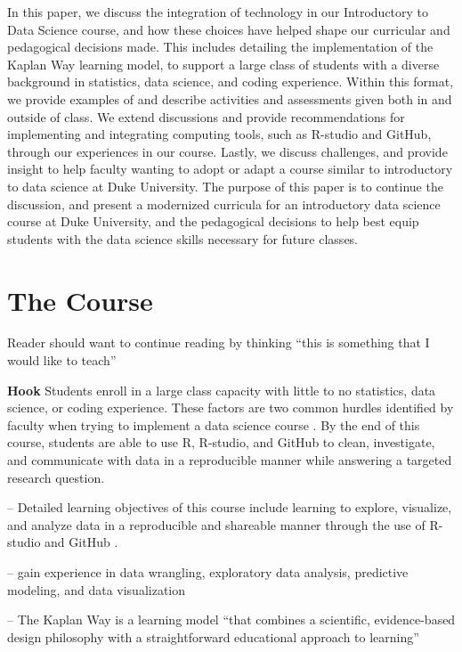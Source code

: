 \documentclass[
  12pt]{article}
\begin{document}
In this paper, we discuss the integration of technology in our
Introductory to Data Science course, and how these choices have helped
shape our curricular and pedagogical decisions made. This includes
detailing the implementation of the Kaplan Way learning model, to
support a large class of students with a diverse background in
statistics, data science, and coding experience. Within this format, we
provide examples of and describe activities and assessments given both
in and outside of class. We extend discussions and provide
recommendations for implementing and integrating computing tools, such
as R-studio and GitHub, through our experiences in our course. Lastly,
we discuss challenges, and provide insight to help faculty wanting to
adopt or adapt a course similar to introductory to data science at Duke
University. The purpose of this paper is to continue the discussion, and
present a modernized curricula for an introductory data science course
at Duke University, and the pedagogical decisions to help best equip
students with the data science skills necessary for future classes.

\hypertarget{sec-course}{%
\section{The Course}\label{sec-course}}

Reader should want to continue reading by thinking ``this is something
that I would like to teach''

\textbf{Hook} Students enroll in a large class capacity with little to
no statistics, data science, or coding experience. These factors are two
common hurdles identified by faculty when trying to implement a data
science course \citep{Schwab2020, Kok_2008}. By the end of this course,
students are able to use R, R-studio, and GitHub to clean, investigate,
and communicate with data in a reproducible manner while answering a
targeted research question.

-- Detailed learning objectives of this course include learning to
explore, visualize, and analyze data in a reproducible and shareable
manner through the use of R-studio and GitHub \citep{R21, github}.

-- gain experience in data wrangling, exploratory data analysis,
predictive modeling, and data visualization

-- The Kaplan Way is a learning model ``that combines a scientific,
evidence-based design philosophy with a straightforward educational
approach to learning'' \citep{schweser_2023}
\end{document}
